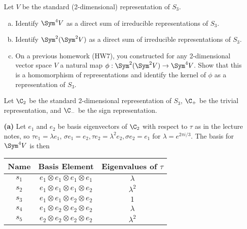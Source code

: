\documentclass[11pt,letterpaper]{article}
\begin{document}
\pagebreak
\begin{problem}
    Let $V$ be the standard (2-dimensional) representation of $S_3$.
    \begin{enumerate}[(a)]
        \item Identify $\Sym^4V$ as a direct sum of irreducible representations of $S_3$.
        \item Identify $\Sym^2(\Sym^2V)$ as a direct sum of irreducible representations of $S_3$.
        \item On a previous homework (HW7), you constructed for any 2-dimensional vector space $V$ a natural map $\phi : \Sym^2(\Sym^2V) \to \Sym^4V$. Show that this is a homomorphism of representations and identify the kernel of $\phi$ as a representation of $S_3$.
    \end{enumerate}
\end{problem}

Let $\C_2$ be the standard 2-dimensional representation of $S_3$, $\C_+$ be the trivial representation, and $\C_-$ be the sign representation.

\textbf{(a)} Let $e_1$ and $e_2$ be basis eigenvectors of $\C_2$ with respect to $\tau$ as in the lecture notes, so $\tau e_1=\lambda e_1$, $\sigma e_1=e_2, \tau e_2=\lambda^2 e_2, \sigma e_2=e_1$ for $\lambda=e^{2\pi i/3}$. The basis for $\Sym^4V$ is then
\begin{center}
\begin{tabular}{ |c|c|c| } 
     \hline
     \textbf{Name}& \textbf{Basis Element} & \textbf{Eigenvalues of $\tau$} \\ 
     \hline
     $s_1$&$e_1\otimes e_1\otimes e_1\otimes e_1$ & $\lambda$ \\ 
     $s_2$&$e_1\otimes e_1\otimes e_1\otimes e_2$ & $\lambda^2$ \\ 
     $s_3$&$e_1\otimes e_1\otimes e_2\otimes e_2$ & $1$ \\ 
     $s_4$&$e_1\otimes e_2\otimes e_2\otimes e_2$ & $\lambda$ \\ 
     $s_5$&$e_2\otimes e_2\otimes e_2\otimes e_2$ & $\lambda^2$ \\ 
 \hline
\end{tabular}
\end{center}
\end{document}
